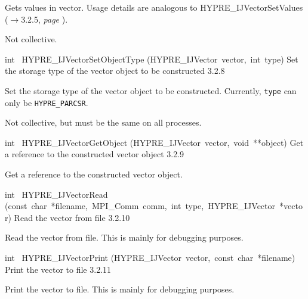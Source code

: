 \documentclass{article}
\begin{document}
\begin{cxxentry}
\begin{cxxentry}
\begin{cxxfunction}
\begin{cxxdoc}
Gets values in vector.  Usage details are analogous to
HYPRE\_IJVectorSetValues ($\rightarrow$3.2.5, {\em page \pageref{cxx.3.2.5}}).

Not collective.
\end{cxxdoc}
\end{cxxfunction}
\begin{cxxfunction}
{int\ }
        {HYPRE\_IJVectorSetObjectType}
        {(HYPRE\_IJVector\ vector,\ int\ type)}
        {
Set the storage type of the vector object to be constructed}
        {3.2.8}
\begin{cxxdoc}

Set the storage type of the vector object to be constructed.
Currently, {\tt type} can only be {\tt HYPRE\_PARCSR}.

Not collective, but must be the same on all processes.


\end{cxxdoc}
\end{cxxfunction}
\begin{cxxfunction}
{int\ }
        {HYPRE\_IJVectorGetObject}
        {(HYPRE\_IJVector\ vector,\ void\ **object)}
        {
Get a reference to the constructed vector object}
        {3.2.9}
\begin{cxxdoc}

Get a reference to the constructed vector object.


\end{cxxdoc}
\end{cxxfunction}
\begin{cxxfunction}
{int\ }
        {HYPRE\_IJVectorRead}
        {(const\ char\ *filename,\ MPI\_Comm\ comm,\ int\ type,\ HYPRE\_IJVector\ *vector)}
        {
Read the vector from file}
        {3.2.10}
\begin{cxxdoc}

Read the vector from file.  This is mainly for debugging purposes.
\end{cxxdoc}
\end{cxxfunction}
\begin{cxxfunction}
{int\ }
        {HYPRE\_IJVectorPrint}
        {(HYPRE\_IJVector\ vector,\ const\ char\ *filename)}
        {
Print the vector to file}
        {3.2.11}
\begin{cxxdoc}

Print the vector to file.  This is mainly for debugging purposes.
\end{cxxdoc}
\end{cxxfunction}
\end{cxxentry}
\end{cxxentry}
\end{document}
